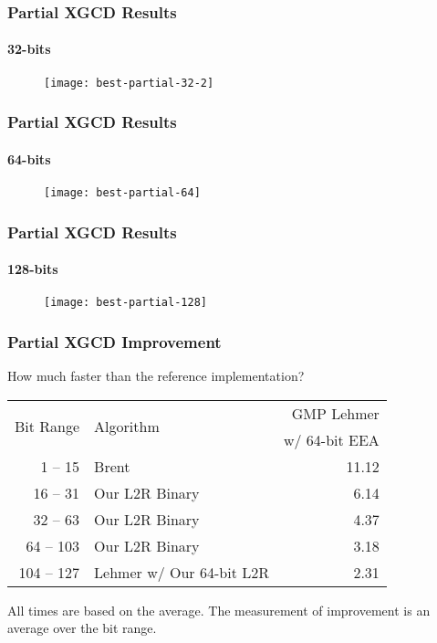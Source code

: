 \documentclass{beamer}
\newcommand{\smallfont}{\fontsize{6pt}{7.2}\selectfont}
\begin{document}
\begin{frame}
\frametitle{Partial XGCD Results}
\framesubtitle{32-bits}
\begin{figure}
\texttt{[image: best-partial-32-2]}
\end{figure}
\end{frame}
\begin{frame}
\frametitle{Partial XGCD Results}
\framesubtitle{64-bits}
\begin{figure}
\texttt{[image: best-partial-64]}
\end{figure}
\end{frame}
\begin{frame}
\frametitle{Partial XGCD Results}
\framesubtitle{128-bits}
\begin{figure}
\texttt{[image: best-partial-128]}
\end{figure}
\end{frame}

\begin{frame}
\frametitle{Partial XGCD Improvement}
How much faster than the reference implementation?
\begin{table}
\centering
\begin{tabular}{ | r | l | r | }
\hline
\multirow{2}{*}{Bit Range} & \multirow{2}{*}{Algorithm} & GMP Lehmer \\
& & w/ 64-bit EEA \\
\hline
1 -- 15 & Brent & 11.12 \\
16 -- 31 & Our L2R Binary & 6.14 \\
32 -- 63 & Our L2R Binary & 4.37 \\
64 -- 103 & Our L2R Binary & 3.18 \\
104 -- 127 & Lehmer w/ Our 64-bit L2R & 2.31 \\
\hline
\end{tabular}
\end{table}

\bigskip
\smallfont
All times are based on the average.  The measurement of improvement is an average over the bit range.

\end{frame}
\end{document}

